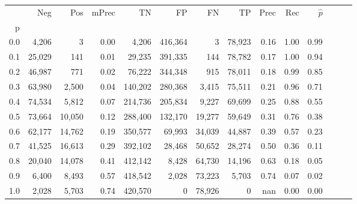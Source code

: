 \begin{tabular}{rrrrrrrrrrrrrr}
\toprule
{} &     Neg &     Pos & mPrec &       TN &       FP &      FN &      TP &  Prec &   Rec & $\hat{p}$ \\
p   &         &         &       &          &          &         &         &       &       &           \\
\midrule
0.0 &   4,206 &       3 &  0.00 &    4,206 &  416,364 &       3 &  78,923 &  0.16 &  1.00 &      0.99 \\
0.1 &  25,029 &     141 &  0.01 &   29,235 &  391,335 &     144 &  78,782 &  0.17 &  1.00 &      0.94 \\
0.2 &  46,987 &     771 &  0.02 &   76,222 &  344,348 &     915 &  78,011 &  0.18 &  0.99 &      0.85 \\
0.3 &  63,980 &   2,500 &  0.04 &  140,202 &  280,368 &   3,415 &  75,511 &  0.21 &  0.96 &      0.71 \\
0.4 &  74,534 &   5,812 &  0.07 &  214,736 &  205,834 &   9,227 &  69,699 &  0.25 &  0.88 &      0.55 \\
0.5 &  73,664 &  10,050 &  0.12 &  288,400 &  132,170 &  19,277 &  59,649 &  0.31 &  0.76 &      0.38 \\
0.6 &  62,177 &  14,762 &  0.19 &  350,577 &   69,993 &  34,039 &  44,887 &  0.39 &  0.57 &      0.23 \\
0.7 &  41,525 &  16,613 &  0.29 &  392,102 &   28,468 &  50,652 &  28,274 &  0.50 &  0.36 &      0.11 \\
0.8 &  20,040 &  14,078 &  0.41 &  412,142 &    8,428 &  64,730 &  14,196 &  0.63 &  0.18 &      0.05 \\
0.9 &   6,400 &   8,493 &  0.57 &  418,542 &    2,028 &  73,223 &   5,703 &  0.74 &  0.07 &      0.02 \\
1.0 &   2,028 &   5,703 &  0.74 &  420,570 &        0 &  78,926 &       0 &   nan &  0.00 &      0.00 \\
\bottomrule
\end{tabular}
